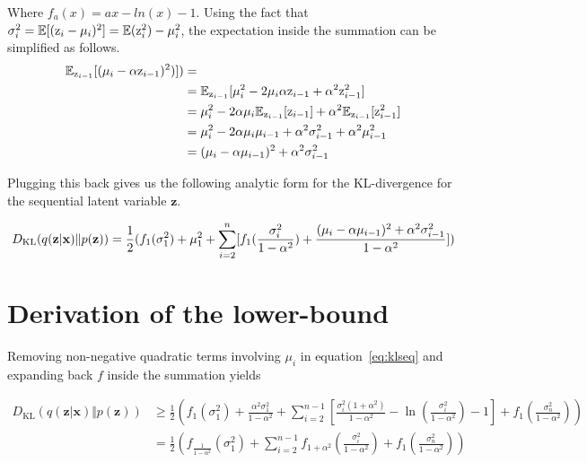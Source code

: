 \documentclass{article} \usepackage{iclr2019_conference,times}
\def\eqref#1{equation~\ref{#1}}
\def\rz{{\textnormal{z}}}
\def\rvx{{\mathbf{x}}}
\def\rvz{{\mathbf{z}}}
\newcommand{\E}{\mathbb{E}}
\newcommand{\KL}{D_{\mathrm{KL}}}
\begin{document}
Where $f_a(x) = ax - ln(x) - 1$. Using the fact that $\sigma_i^2 = \E[(\rz_i - \mu_i)^2] = \E(\rz_i^2) - \mu_i^2$, the  expectation inside the summation can be simplified as follows.
\begin{equation*}
    \begin{aligned}
     \E_{\rz_{i-1}}[(\mu_i - \alpha \rz_{i-1})^2)]) & = \\
      & = \E_{\rz_{i-1}} [\mu_i^2 - 2\mu_i \alpha \rz_{i-1} + \alpha^2 \rz_{i - 1}^2] \\
      & = \mu_i^2 - 2\alpha \mu_i \E_{\rz_{i-1}}[\rz_{i-1}] + \alpha^2 \E_{\rz_{i-1}}[\rz_{i - 1}^2] \\
      & = \mu_i^2 - 2\alpha \mu_i \mu_{i-1} + \alpha^2 \sigma_{i - 1}^2 + \alpha^2 \mu_{i-1}^2 \\
      & = (\mu_i - \alpha\mu_{i-1})^2 + \alpha^2\sigma_{i-1}^2
    \end{aligned}
\end{equation*}

Plugging this back gives us the following analytic form for the KL-divergence for the sequential latent variable $\rvz$.

\begin{equation}\label{eq:klseq}
\KL(q(\rvz|\rvx) \Vert p(\rvz)) = \frac{1}{2}(
    f_1(\sigma_1^2) + \mu_1^2
    + \sum_{i=2}^n [f_1(\frac{\sigma_i^2}{1-\alpha^2}) +
        \frac{(\mu_i-\alpha\mu_{i-1})^2 + \alpha^2\sigma_{i-1}^2}{1-\alpha^2}]) \\
\end{equation}

\section{Derivation of the lower-bound}\label{app:deriv}

Removing non-negative quadratic terms involving $\mu_i$ in \eqref{eq:klseq} and expanding back $f$ inside the summation yields

\begin{equation*}
\begin{aligned}
\KL(q(\rvz|\rvx) \Vert p(\rvz)) & \ge \frac{1}{2}(f_1(\sigma_1^2) +
    \frac{\alpha^2\sigma_1^2}{1-\alpha^2} +
    \sum_{i=2}^{n-1} [\frac{\sigma_i^2(1+\alpha^2)}{1-\alpha^2} - \ln(\frac{\sigma_i^2}{1-\alpha^2}) - 1] + f_1(\frac{\sigma_n^2}{1-\alpha^2}) ) \\
    & = \frac{1}{2}(f_{\frac{1}{1-\alpha^2}}(\sigma_1^2) + 
    \sum_{i=2}^{n-1} f_{1+\alpha^2}(\frac{\sigma_i^2}{1-\alpha^2}) +
    f_1(\frac{\sigma_n^2}{1-\alpha^2}))
\end{aligned}
\end{equation*}
\end{document}
